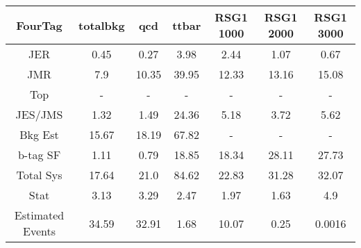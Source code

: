 \begin{footnotesize} 
\begin{tabular}{c|c|c|c|c|c|c} 
FourTag & totalbkg & qcd & ttbar & RSG1 1000 & RSG1 2000 & RSG1 3000 \\ 
\hline\hline 
JER & 0.45 & 0.27 & 3.98 & 2.44 & 1.07 & 0.67\\ 
JMR & 7.9 & 10.35 & 39.95 & 12.33 & 13.16 & 15.08\\ 
Top &  -  &  -  &  -  &  -  &  -  &  - \\ 
JES/JMS & 1.32 & 1.49 & 24.36 & 5.18 & 3.72 & 5.62\\ 
Bkg Est & 15.67 & 18.19 & 67.82 &  -  &  -  &  - \\ 
b-tag SF & 1.11 & 0.79 & 18.85 & 18.34 & 28.11 & 27.73\\ 
\hline 
Total Sys & 17.64 & 21.0 & 84.62 & 22.83 & 31.28 & 32.07\\ 
\hline 
Stat & 3.13 & 3.29 & 2.47 & 1.97 & 1.63 & 4.9\\ 
\hline 
Estimated Events & 34.59 & 32.91 & 1.68 & 10.07 & 0.25 & 0.0016\\ 
\hline\hline 
\end{tabular} 
\end{footnotesize} 
\newline 
